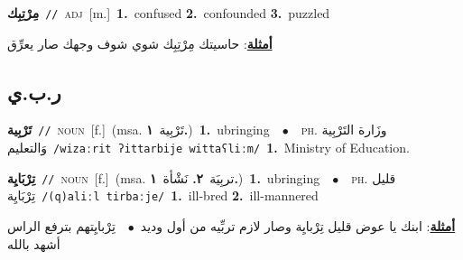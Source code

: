 \documentclass[10pt,a4paper,twoside]{article} %
\begin{document}
\begin{multicols}{2}
{\setlength\topsep{0pt}\textbf{\foreignlanguage{arabic}{مِرْتِبِك}}\ {\color{gray}\texttt{//}\color{black}}\ \textsc{adj}\ [m.]\ \textbf{1.}~confused  \textbf{2.}~confounded  \textbf{3.}~puzzled\  \begin{flushright}\color{gray}\foreignlanguage{arabic}{\textbf{\underline{\foreignlanguage{arabic}{أمثلة}}}: حاسيتك مِرْتِبِك شوي شوف وجهك صار يعرِّق}\end{flushright}\color{black}} \vspace{2mm}

\vspace{-3mm}
\subsection*{\color{blue}\foreignlanguage{arabic}{ر.ب.ي}\color{blue}{}} 

{\setlength\topsep{0pt}\textbf{\foreignlanguage{arabic}{تَرْبِية}}\ {\color{gray}\texttt{//}\color{black}}\ \textsc{noun}\ [f.]\ \color{gray}(msa. \foreignlanguage{arabic}{تَرْبِية}~\foreignlanguage{arabic}{\textbf{١.}})\color{black}\ \textbf{1.}~ubringing\ \ $\bullet$\ \ \textsc{ph.} \color{gray} \foreignlanguage{arabic}{وزَارة التَرْبِية وَالتعليم}\color{black}\ {\color{gray}\texttt{/{\sffamily wizaːrit ʔittarbije wittaʕliːm}/}\color{black}}\ \textbf{1.}~Ministry of Education.\ } \vspace{2mm}

{\setlength\topsep{0pt}\textbf{\foreignlanguage{arabic}{تِرْبَايِة}}\ {\color{gray}\texttt{//}\color{black}}\ \textsc{noun}\ [f.]\ \color{gray}(msa. \foreignlanguage{arabic}{تربِيَة}~\foreignlanguage{arabic}{\textbf{٢.}}  \foreignlanguage{arabic}{نَشْأة}~\foreignlanguage{arabic}{\textbf{١.}})\color{black}\ \textbf{1.}~ubringing\ \ $\bullet$\ \ \textsc{ph.} \color{gray} \foreignlanguage{arabic}{قليل تِرْبَايِة}\color{black}\ {\color{gray}\texttt{/{\sffamily (q)aliːl tirbaːje}/}\color{black}}\ \textbf{1.}~ill-bred  \textbf{2.}~ill-mannered\  \begin{flushright}\color{gray}\foreignlanguage{arabic}{\textbf{\underline{\foreignlanguage{arabic}{أمثلة}}}: ابنك يا عوض قليل تِرْبايِة وصار لازم تربِّيه من أول وديد\ $\bullet$\ \  تِرْبايِتهم بترفع الراس أشهد بالله}\end{flushright}\color{black}} \vspace{2mm}


\end{multicols}
\end{document}
